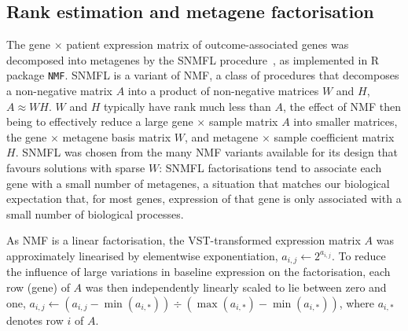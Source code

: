 \documentclass[dissertation.tex]{subfiles}
\begin{document}
\subsection{Rank estimation and metagene factorisation}
\label{subsec:sigs-nmf}
The gene $\times$ patient expression matrix of outcome-associated genes was decomposed into metagenes by the \gls{SNMFL} procedure~\cite{Kim2007}, as implemented in R package \texttt{NMF}.  \gls{SNMFL} is a variant of \gls{NMF}, a class of procedures that decomposes a non-negative matrix $A$ into a product of non-negative matrices $W$ and $H$, $A \approx WH$.  $W$ and $H$ typically have rank much less than $A$, the effect of \gls{NMF} then being to effectively reduce a large gene $\times$ sample matrix $A$ into smaller matrices, the gene $\times$ metagene basis matrix $W$, and metagene $\times$ sample coefficient matrix $H$.  \gls{SNMFL} was chosen from the many \gls{NMF} variants available for its design that favours solutions with sparse $W$: \gls{SNMFL} factorisations tend to associate each gene with a small number of metagenes, a situation that matches our biological expectation that, for most genes, expression of that gene is only associated with a small number of biological processes.

As \gls{NMF} is a linear factorisation, the \gls{VST}-transformed expression matrix $A$ was approximately linearised by elementwise exponentiation, $a_{i,j} \leftarrow 2^{a_{i,j}}$.  To reduce the influence of large variations in baseline expression on the factorisation, each row (gene) of $A$ was then independently linearly scaled to lie between zero and one, $a_{i,j} \leftarrow (a_{i,j} - \min(a_{i,*})) \div (\max(a_{i,*}) - \min(a_{i,*}))$, where $a_{i,*}$ denotes row $i$ of $A$.
\end{document}
